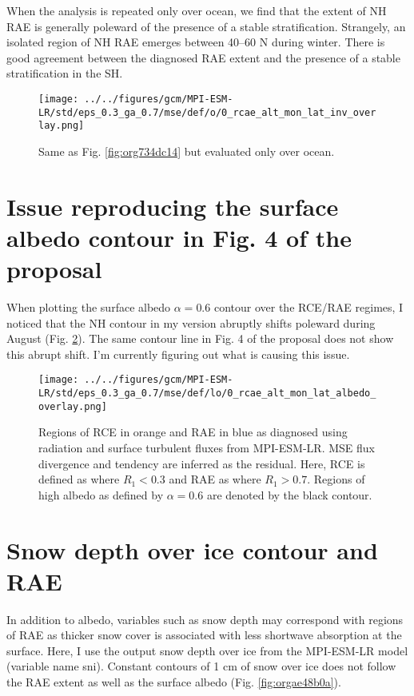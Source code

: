 \documentclass[11pt]{article}
\begin{document}
When the analysis is repeated only over ocean, we find that the extent of NH RAE is generally poleward of the presence of a stable stratification. Strangely, an isolated region of NH RAE emerges between 40--60 N during winter. There is good agreement between the diagnosed RAE extent and the presence of a stable stratification in the SH.

\begin{figure}[htbp]
\centering
\texttt{[image: ../../figures/gcm/MPI-ESM-LR/std/eps\_0.3\_ga\_0.7/mse/def/o/0\_rcae\_alt\_mon\_lat\_inv\_overlay.png]}
\caption{\label{fig:org7fca9bb}Same as Fig. \ref{fig:org734dc14} but evaluated only over ocean.}
\end{figure}

\section{Issue reproducing the surface albedo contour in Fig. 4 of the proposal}
\label{sec:org4206401}
When plotting the surface albedo \(\alpha=0.6\) contour over the RCE/RAE regimes, I noticed that the NH contour in my version abruptly shifts poleward during August (Fig. \ref{fig:orgfd6ae58}). The same contour line in Fig. 4 of the proposal does not show this abrupt shift. I'm currently figuring out what is causing this issue.

\begin{figure}[htbp]
\centering
\texttt{[image: ../../figures/gcm/MPI-ESM-LR/std/eps\_0.3\_ga\_0.7/mse/def/lo/0\_rcae\_alt\_mon\_lat\_albedo\_overlay.png]}
\caption{\label{fig:orgfd6ae58}Regions of RCE in orange and RAE in blue as diagnosed using radiation and surface turbulent fluxes from MPI-ESM-LR. MSE flux divergence and tendency are inferred as the residual. Here, RCE is defined as where \(R_1 < 0.3\) and RAE as where \(R_1 > 0.7\). Regions of high albedo as defined by \(\alpha=0.6\) are denoted by the black contour.}
\end{figure}

\section{Snow depth over ice contour and RAE}
\label{sec:orgb3338f0}
In addition to albedo, variables such as snow depth may correspond with regions of RAE as thicker snow cover is associated with less shortwave absorption at the surface. Here, I use the output snow depth over ice from the MPI-ESM-LR model (variable name sni). Constant contours of 1 cm of snow over ice does not follow the RAE extent as well as the surface albedo (Fig. \ref{fig:orgae48b0a}).
\end{document}
